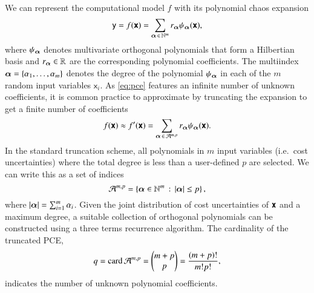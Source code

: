 We can represent the computational model $f$ with its polynomial chaos expansion
\begin{equation}
    \mathsf{y} = f(\boldsymbol{\mathsf{x}}) = \sum_{{\bm{\alpha}} \,\in\, \mathbb{N}^m} r_{{\bm{\alpha}}} \psi_{{\bm{\alpha}}}(\boldsymbol{\mathsf{x}}),
    \label{eq:pce}
\end{equation}
where $\psi_{\bm{\alpha}}$ denotes multivariate orthogonal polynomials that form a
Hilbertian basis and $r_{\bm{\alpha}} \in \mathbb{R}$ are the corresponding polynomial
coefficients.\cite{sudret_global_2008} The multiindex ${\bm{\alpha}} =
\{\alpha_1,\dots,\alpha_m\}$ denotes the degree of the polynomial $\psi_{\bm{\alpha}}$ in
each of the $m$ random input variables $\mathsf{x}_i$. As \cref{eq:pce} features
an infinite number of unknown coefficients, it is common practice to approximate
by truncating the expansion to get a finite number of coefficients
\begin{equation}
    f(\boldsymbol{\mathsf{x}}) \approx f'(\boldsymbol{\mathsf{x}}) = \sum_{{\bm{\alpha}} \,\in\, \mathcal{A}^{m,p}} r_{\bm{\alpha}} \psi_{\bm{\alpha}}(\boldsymbol{\mathsf{x}}).
\end{equation}
In the standard truncation
scheme,\cite{gratiet_metamodel-based_2015,sudret_global_2008} all polynomials in
$m$ input variables (i.e.~cost uncertainties) where the total degree is less
than a user-defined $p$ are selected. We can write this as a set of indices
\begin{equation}
    \label{eq:ca}
    \mathcal{A}^{m,p} = \left\{{\bm{\alpha}} \in \mathbb{N}^m \,:\, \left|{\bm{\alpha}}\right| \leq p\right\},
\end{equation}
where $\left|{\bm{\alpha}}\right| = \sum_{i=1}^m \alpha_i$. Given the joint distribution of cost
uncertainties of $\boldsymbol{\mathsf{x}}$ and a maximum degree, a suitable collection of orthogonal
polynomials can be constructed using a three terms recurrence
algorithm.\cite{feinberg_chaospy_2015} The cardinality of the truncated PCE,
\begin{equation}
    q = \text{card}\, \mathcal{A}^{m,p} = \left(\begin{matrix}
        m+p \\
        p
    \end{matrix}\right) = \frac{(m+p)!}{m!p!},
    \label{eq:cardinality}
\end{equation}
indicates the number of unknown polynomial coefficients.

